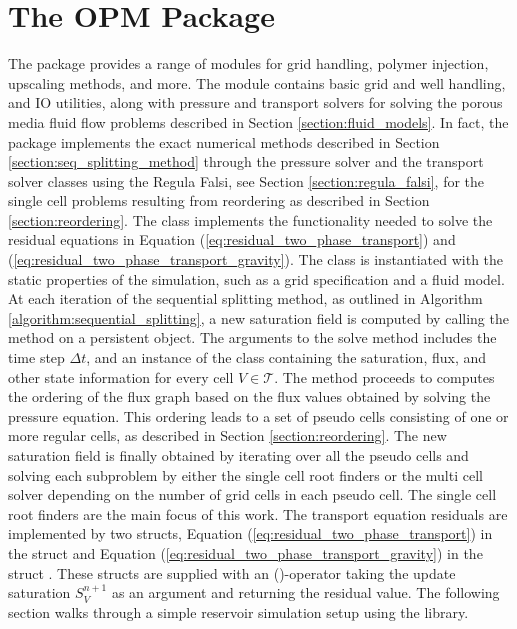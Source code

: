 \section{The OPM Package}
\label{section:opm_package}
The \opm package provides a range of modules for grid handling, polymer injection, upscaling methods, and more. The  module contains basic grid and well handling, and IO utilities, along with pressure and transport solvers for solving the porous media fluid flow problems described in Section \ref{section:fluid_models}. In fact, the \opm package implements the exact numerical methods described in Section \ref{section:seq_splitting_method} through the  pressure solver and the  transport solver classes using the Regula Falsi, see Section \ref{section:regula_falsi}, for the single cell problems resulting from  reordering as described in Section \ref{section:reordering}. The class  implements the functionality needed to solve the residual equations in Equation (\ref{eq:residual_two_phase_transport}) and (\ref{eq:residual_two_phase_transport_gravity}). The class is instantiated with the static properties of the simulation, such as a grid specification and a fluid model. At each iteration of the sequential splitting method, as outlined in Algorithm \ref{algorithm:sequential_splitting}, a new saturation field is computed by calling the method  on a persistent  object. The arguments to the solve method includes the time step $\Delta t$, and an instance of the class  containing the saturation, flux, and other state information for every cell $V \in \mathcal{T}$. The  method proceeds to computes the ordering of the flux graph based on the flux values obtained by solving the pressure equation. This ordering leads to a set of pseudo cells consisting of one or more regular cells, as described in Section \ref{section:reordering}. The new saturation field is finally obtained by iterating over all the pseudo cells and solving each subproblem by either the single cell root finders or the multi cell solver depending on the number of grid cells in each pseudo cell. The single cell root finders are the main focus of this work. The transport equation residuals are implemented by two structs, Equation (\ref{eq:residual_two_phase_transport}) in the struct  and Equation (\ref{eq:residual_two_phase_transport_gravity}) in the struct . These structs are supplied with an ()-operator taking the update saturation $S_V^{n+1}$ as an argument and returning the residual value. The following section walks through a simple reservoir simulation setup using the \opm library.


